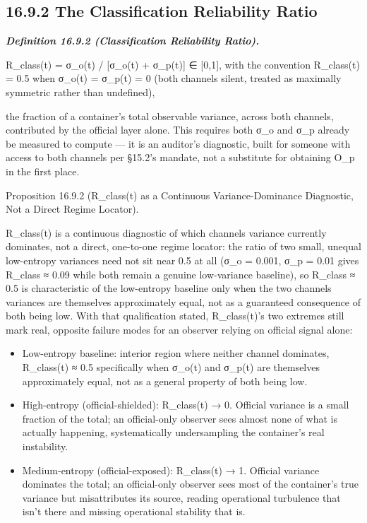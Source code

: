 \documentclass[
]{article}
\begin{document}
\hypertarget{the-classification-reliability-ratio}{%
\subsection{16.9.2 The Classification Reliability
Ratio}\label{the-classification-reliability-ratio}}

\emph{\textbf{Definition 16.9.2 (Classification Reliability Ratio).}}

R\_class(t) = σ\_o(t) / {[}σ\_o(t) + σ\_p(t){]} ∈ {[}0,1{]}, with the
convention R\_class(t) = 0.5 when σ\_o(t) = σ\_p(t) = 0 (both channels
silent, treated as maximally symmetric rather than undefined),

the fraction of a container's total observable variance, across both
channels, contributed by the official layer alone. This requires both
σ\_o and σ\_p already be measured to compute --- it is an auditor's
diagnostic, built for someone with access to both channels per §15.2's
mandate, not a substitute for obtaining O\_p in the first place.

Proposition 16.9.2 (R\_class(t) as a Continuous Variance-Dominance
Diagnostic, Not a Direct Regime Locator).

R\_class(t) is a continuous diagnostic of which channels variance
currently dominates, not a direct, one-to-one regime locator: the ratio
of two small, unequal low-entropy variances need not sit near 0.5 at all
(σ\_o = 0.001, σ\_p = 0.01 gives R\_class ≈ 0.09 while both remain a
genuine low-variance baseline), so R\_class ≈ 0.5 is characteristic of
the low-entropy baseline only when the two channels variances are
themselves approximately equal, not as a guaranteed consequence of both
being low. With that qualification stated, R\_class(t)'s two extremes
still mark real, opposite failure modes for an observer relying on
official signal alone:

\begin{itemize}
\item
  Low-entropy baseline: interior region where neither channel dominates,
  R\_class(t) ≈ 0.5 specifically when σ\_o(t) and σ\_p(t) are themselves
  approximately equal, not as a general property of both being low.
\item
  High-entropy (official-shielded): R\_class(t) → 0. Official variance
  is a small fraction of the total; an official-only observer sees
  almost none of what is actually happening, systematically
  undersampling the container's real instability.
\item
  Medium-entropy (official-exposed): R\_class(t) → 1. Official variance
  dominates the total; an official-only observer sees most of the
  container's true variance but misattributes its source, reading
  operational turbulence that isn't there and missing operational
  stability that is.
\end{itemize}
\end{document}
